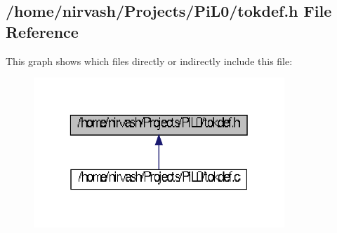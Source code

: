 \subsection{/home/nirvash/\-Projects/\-Pi\-L0/tokdef.h \-File \-Reference}
\label{tokdef_8h}
\-This graph shows which files directly or indirectly include this file\-:\nopagebreak
\begin{figure}[H]
\begin{center}
\leavevmode
\includegraphics[width=268pt]{tokdef_8h__dep__incl}
\end{center}
\end{figure}
